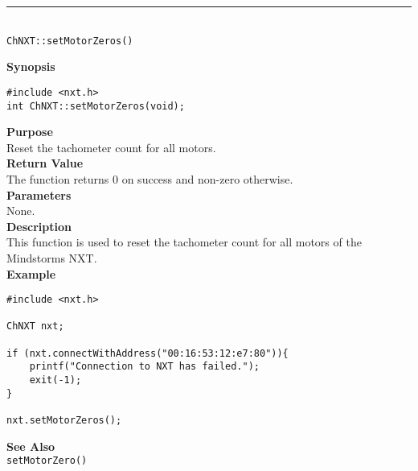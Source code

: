 \noindent
\vspace{5pt}
\rule{4.5in}{0.015in}\\
\noindent
{\LARGE \texttt{ChNXT::setMotorZeros()} }\\


\noindent
{\bf Synopsis}
\begin{lstlisting}
#include <nxt.h>
int ChNXT::setMotorZeros(void);
\end{lstlisting}

\noindent
{\bf Purpose}\\
Reset the tachometer count for all motors.\\

\noindent
{\bf Return Value}\\
The function returns 0 on success and non-zero otherwise.\\

\noindent
{\bf Parameters}\\
None.\\

\noindent
{\bf Description}\\
This function is used to reset the tachometer count for 
all motors of the Mindstorms NXT.\\

\noindent
{\bf Example}
\begin{lstlisting}
#include <nxt.h> 

ChNXT nxt;

if (nxt.connectWithAddress("00:16:53:12:e7:80")){
    printf("Connection to NXT has failed.");
    exit(-1);
}
    
nxt.setMotorZeros();
\end{lstlisting}

\noindent
{\bf See Also}\\
\texttt{setMotorZero()}\\
